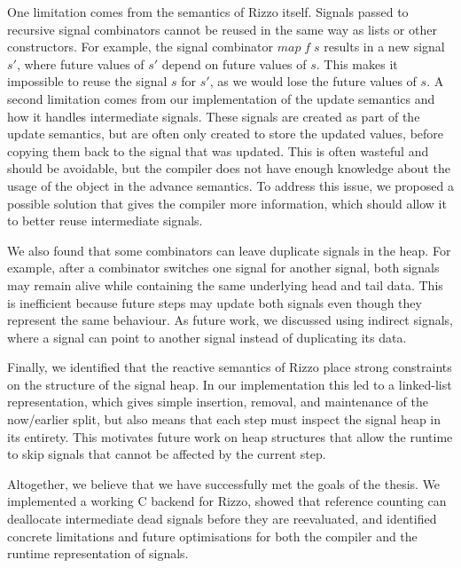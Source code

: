 One limitation comes from the semantics of Rizzo itself.
Signals passed to recursive signal combinators cannot be reused in the same way as lists or other constructors.
For example, the signal combinator $map \; f \; s$ results in a new signal $s'$, where future values of $s'$ depend on future values of $s$. This makes it impossible to reuse the signal $s$ for $s'$, as we would lose the future values of $s$.
A second limitation comes from our implementation of the update semantics and how it handles intermediate signals. These signals are created as part of the update semantics, but are often only created to store the updated values, before copying them back to the signal that was updated. This is often wasteful and should be avoidable, but the compiler does not have enough knowledge about the usage of the object in the advance semantics.
To address this issue, we proposed a possible solution that gives the compiler more information, which should allow it to better reuse intermediate signals.

We also found that some combinators can leave duplicate signals in the heap. For example, after a combinator switches one signal for another signal, both signals may remain alive while containing the same underlying head and tail data. This is inefficient because future steps may update both signals even though they represent the same behaviour. As future work, we discussed using indirect signals, where a signal can point to another signal instead of duplicating its data.

Finally, we identified that the reactive semantics of Rizzo place strong constraints on the structure of the signal heap. In our implementation this led to a linked-list representation, which gives simple insertion, removal, and maintenance of the now/earlier split, but also means that each step must inspect the signal heap in its entirety. This motivates future work on heap structures that allow the runtime to skip signals that cannot be affected by the current step.

Altogether, we believe that we have successfully met the goals of the thesis.
We implemented a working C backend for Rizzo, showed that reference counting can deallocate intermediate dead signals before they are reevaluated, and identified concrete limitations and future optimisations for both the compiler and the runtime representation of signals.

